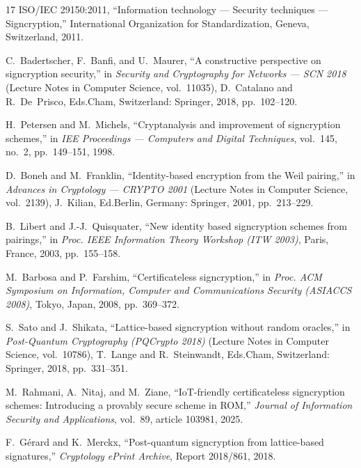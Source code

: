 \documentclass[conference]{IEEEtran}
\begin{document}
\begin{thebibliography}{17}
ISO/IEC 29150:2011, ``Information technology --- Security techniques --- Signcryption,'' International Organization for Standardization, Geneva, Switzerland, 2011.

C.~Badertscher, F.~Banfi, and U.~Maurer, ``A constructive perspective on signcryption security,'' in \textit{Security and Cryptography for Networks --- SCN 2018} (Lecture Notes in Computer Science, vol.~11035), D.~Catalano and R.~De~Prisco, Eds.\hspace{1em}Cham, Switzerland: Springer, 2018, pp.~102--120.

H.~Petersen and M.~Michels, ``Cryptanalysis and improvement of signcryption schemes,'' in \textit{IEE Proceedings --- Computers and Digital Techniques}, vol.~145, no.~2, pp.~149--151, 1998.

D.~Boneh and M.~Franklin, ``Identity-based encryption from the Weil pairing,'' in \textit{Advances in Cryptology --- CRYPTO 2001} (Lecture Notes in Computer Science, vol.~2139), J.~Kilian, Ed.\hspace{1em}Berlin, Germany: Springer, 2001, pp.~213--229.

B.~Libert and J.-J.~Quisquater, ``New identity based signcryption schemes from pairings,'' in \textit{Proc. IEEE Information Theory Workshop (ITW 2003)}, Paris, France, 2003, pp.~155--158.

M.~Barbosa and P.~Farshim, ``Certificateless signcryption,'' in \textit{Proc. ACM Symposium on Information, Computer and Communications Security (ASIACCS 2008)}, Tokyo, Japan, 2008, pp.~369--372.

S.~Sato and J.~Shikata, ``Lattice-based signcryption without random oracles,'' in \textit{Post-Quantum Cryptography (PQCrypto 2018)} (Lecture Notes in Computer Science, vol.~10786), T.~Lange and R.~Steinwandt, Eds.\hspace{1em}Cham, Switzerland: Springer, 2018, pp.~331--351.

M.~Rahmani, A.~Nitaj, and M.~Ziane, ``IoT-friendly certificateless signcryption schemes: Introducing a provably secure scheme in ROM,'' \textit{Journal of Information Security and Applications}, vol.~89, article 103981, 2025.

F.~G\'{e}rard and K.~Merckx, ``Post-quantum signcryption from lattice-based signatures,'' \textit{Cryptology ePrint Archive}, Report 2018/861, 2018.

\end{thebibliography}
\end{document}
